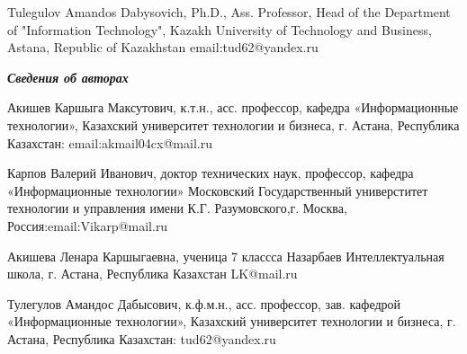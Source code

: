 Tulegulov Amandos Dabysovich, Ph.D., Ass. Professor, Head of the
Department of "Information Technology", Kazakh University of Technology
and Business, Astana, Republic of Kazakhstan email:tud62@yandex.ru

\emph{{\bfseries Сведения об авторах}}

Акишев Каршыга Максутович, к.т.н., асс. профессор, кафедра
«Информационные технологии», Казахский университет технологии и бизнеса,
г. Астана, Республика Казахстан: email:akmail04cx@mail.ru

Карпов Валерий Иванович, доктор технических наук, профессор, кафедра
«Информационные технологии» Московский Государственный универститет
технологии и управления имени К.Г. Разумовского,г. Москва,
Россия:email:Vikarp@mail.ru

Акишева Ленара Каршыгаевна, ученица 7 классса Назарбаев Интеллектуальная
школа, г. Астана, Республика Казахстан LK@mail.ru

Тулегулов Амандос Дабысович, к.ф.м.н., асс. профессор, зав. кафедрой
«Информационные технологии», Казахский университет технологии и бизнеса,
г. Астана, Республика Казахстан: tud62@yandex.ru
